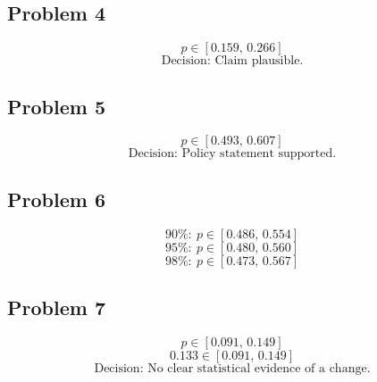 \subsection*{Problem 4}
\[
p \in [0.159,\,0.266]
\]
\[
\text{Decision: Claim plausible.}
\]

\subsection*{Problem 5}
\[
p \in [0.493,\,0.607]
\]
\[
\text{Decision: Policy statement supported.}
\]

\subsection*{Problem 6}
\[
90\%:\ p \in [0.486,\,0.554]
\]
\[
95\%:\ p \in [0.480,\,0.560]
\]
\[
98\%:\ p \in [0.473,\,0.567]
\]

\subsection*{Problem 7}
\[
p \in [0.091,\,0.149]
\]
\[
0.133 \in [0.091,\,0.149]
\]
\[
\text{Decision: No clear statistical evidence of a change.}
\]


